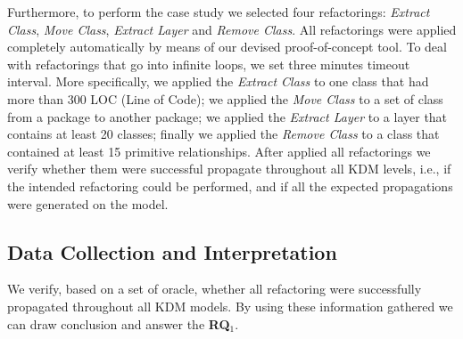 Furthermore, to perform the case study we selected four refactorings: \textit{Extract Class}, \textit{Move Class}, \textit{Extract Layer} and \textit{Remove Class}. %
All refactorings were applied completely automatically by means of our devised proof-of-concept tool. To deal with refactorings that go into infinite loops, we set three minutes timeout interval. More specifically, we applied the \textit{Extract Class} to one class that had more than 300 LOC (Line of Code); we applied the \textit{Move Class} to a set of  class from a package to another package; we applied the \textit{Extract Layer} to a layer that contains at least 20 classes; finally we applied the \textit{Remove Class} to a class that contained at least 15 primitive relationships. After applied all refactorings we verify whether them were successful propagate throughout all KDM levels, i.e., if the intended refactoring could be performed, and if all the expected propagations were generated on the model. 

\subsection{Data Collection and Interpretation}

We verify, based on a set of oracle, whether all refactoring were successfully propagated throughout all KDM models. By using these information gathered we can draw conclusion and answer the \textbf{RQ$_1$}.


